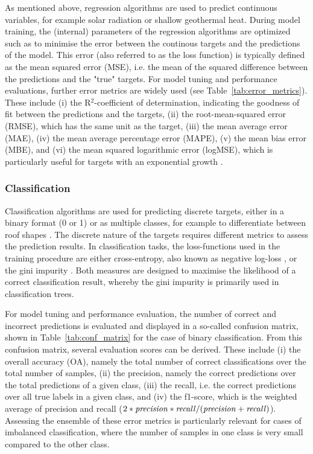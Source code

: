 As mentioned above, regression algorithms are used to predict continuous variables, for example solar radiation or shallow geothermal heat. 
During model training, the (internal) parameters of the regression algorithms are optimized such as to minimise the error between the continous targets and the predictions of the model.
This error (also referred to as the loss function) is typically defined as the mean squared error (MSE), i.e. the mean of the squared difference between the predictions and the "true" targets.
%
For model tuning and performance evaluations, further error metrics are widely used (see Table~\ref{tab:error_metrics}).
These include (i) the R$^2$-coefficient of determination, indicating the goodness of fit between the predictions and the targets, (ii) the root-mean-squared error (RMSE), which has the same unit as the target, (iii) the mean average error (MAE), (iv) the mean average percentage error (MAPE), (v) the mean bias error (MBE), and (vi) the mean squared logarithmic error (logMSE), which is particularly useful for targets with an exponential growth \cite{pedregosa_scikit-learn:_2011}.


\subsubsection{Classification}
Classification algorithms are used for predicting discrete targets, either in a binary format (0 or 1) or as multiple classes, for example to differentiate between roof shapes \cite{mohajeri_city-scale_2018}.
The discrete nature of the targets requires different metrics to assess the prediction results. 
In classification tasks, the loss-functions used in the training procedure are either cross-entropy, also known as negative log-loss \cite{bishop_pattern_2006}, or the gini impurity \cite{breiman_classification_1984}. Both measures are designed to maximise the likelihood of a correct classification result, whereby the gini impurity is primarily used in classification trees.

For model tuning and performance evaluation, the number of correct and incorrect predictions is evaluated and displayed in a so-called confusion matrix, shown in Table~\ref{tab:conf_matrix} for the case of binary classification. From this confusion matrix, several evaluation scores can be derived. These include (i) the overall accuracy (OA), namely the total number of correct classifications over the total number of samples, (ii) the precision, namely the correct predictions over the total predictions of a given class, (iii) the recall, i.e. the correct predictions over all true labels in a given class, and (iv) the f1-score, which is the weighted average of precision and recall ($2*\text{\textit{precision}}*\text{\textit{recall}}/(\text{\textit{precision}}+\text{\textit{recall}})$).
Assessing the ensemble of these error metrics is particularly relevant for cases of imbalanced classification, where the number of samples in one class is very small compared to the other class. 
 
